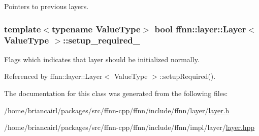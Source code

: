 Pointers to previous layers. 

\hypertarget{classffnn_1_1layer_1_1_layer_a1a366d73e2b1ead280a6956c85ea56cb}{
\subsubsection[{setup\-\_\-required\-\_\-}]{\setlength{\rightskip}{0pt plus 5cm}template$<$typename Value\-Type$>$ bool {\bf ffnn\-::layer\-::\-Layer}$<$ Value\-Type $>$\-::setup\-\_\-required\-\_\-\hspace{0.3cm}{\ttfamily [protected]}}}\label{classffnn_1_1layer_1_1_layer_a1a366d73e2b1ead280a6956c85ea56cb}


Flags which indicates that layer should be initialized normally. 



Referenced by ffnn\-::layer\-::\-Layer$<$ Value\-Type $>$\-::setup\-Required().



The documentation for this class was generated from the following files\-:\begin{DoxyCompactItemize}
\item 
/home/briancairl/packages/src/ffnn-\/cpp/ffnn/include/ffnn/layer/\hyperlink{layer_8h}{layer.\-h}\item 
/home/briancairl/packages/src/ffnn-\/cpp/ffnn/include/ffnn/impl/layer/\hyperlink{layer_8hpp}{layer.\-hpp}\end{DoxyCompactItemize}
